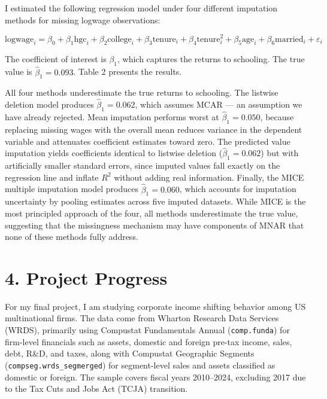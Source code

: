 \documentclass[12pt]{article}
\begin{document}
I estimated the following regression model under four different imputation methods for missing logwage observations:

\begin{equation}
\text{logwage}_i = \beta_0 + \beta_1 \text{hgc}_i + \beta_2 \text{college}_i + \beta_3 \text{tenure}_i + \beta_4 \text{tenure}_i^2 + \beta_5 \text{age}_i + \beta_6 \text{married}_i + \varepsilon_i
\end{equation}

The coefficient of interest is $\beta_1$, which captures the returns to schooling. The true value is $\hat{\beta}_1 = 0.093$. Table 2 presents the results.

\vspace{1em}

\vspace{1em}

All four methods underestimate the true returns to schooling. The listwise deletion model produces $\hat{\beta}_1 = 0.062$, which assumes MCAR --- an assumption we have already rejected. Mean imputation performs worst at $\hat{\beta}_1 = 0.050$, because replacing missing wages with the overall mean reduces variance in the dependent variable and attenuates coefficient estimates toward zero. The predicted value imputation yields coefficients identical to listwise deletion ($\hat{\beta}_1 = 0.062$) but with artificially smaller standard errors, since imputed values fall exactly on the regression line and inflate $R^2$ without adding real information. Finally, the MICE multiple imputation model produces $\hat{\beta}_1 = 0.060$, which accounts for imputation uncertainty by pooling estimates across five imputed datasets. While MICE is the most principled approach of the four, all methods underestimate the true value, suggesting that the missingness mechanism may have components of MNAR that none of these methods fully address.

\section*{4. Project Progress}

For my final project, I am studying corporate income shifting behavior among US multinational firms. The data come from Wharton Research Data Services (WRDS), primarily using Compustat Fundamentals Annual (\texttt{comp.funda}) for firm-level financials such as assets, domestic and foreign pre-tax income, sales, debt, R\&D, and taxes, along with Compustat Geographic Segments (\texttt{compseg.wrds\_segmerged}) for segment-level sales and assets classified as domestic or foreign. The sample covers fiscal years 2010--2024, excluding 2017 due to the Tax Cuts and Jobs Act (TCJA) transition.
\end{document}
